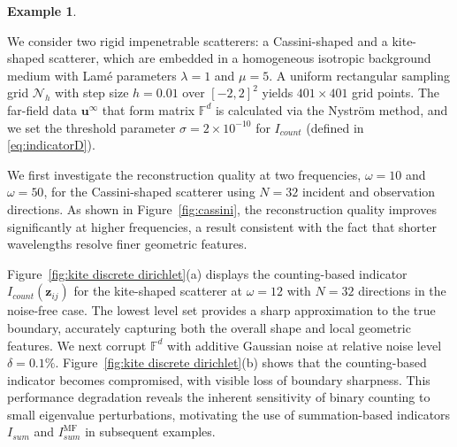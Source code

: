 \documentclass[11pt,reqno,twoside]{amsart}
\theoremstyle{definition}
\newtheorem{example}{Example}[section]
\theoremstyle{remark}
\numberwithin{equation}{section}
\begin{document}
\begin{example}\label{ex:Dirichlet discrete}

We consider two rigid impenetrable scatterers: a Cassini-shaped and a kite-shaped scatterer, which are embedded in a homogeneous isotropic background medium with Lam\'{e} parameters $\lambda = 1$ and $\mu = 5$. A uniform rectangular sampling grid $\mathcal{N}_h$ with step size $h = 0.01$ over $[-2,2]^2$ yields $401 \times 401$ grid points. The far-field data \(\mathbf u^{\infty}\) that form matrix \(\mathbb{F}^d\) is calculated via the Nystr\"{o}m method, and we set the threshold parameter \(\sigma = 2 \times 10^{-10}\) for \(I_{count}\) (defined in \eqref{eq:indicatorD}).

We first investigate the reconstruction quality at two frequencies, $\omega = 10$ and $\omega = 50$, for the Cassini-shaped scatterer using $N = 32$ incident and observation directions. As shown in Figure~\ref{fig:cassini}, the reconstruction quality improves significantly at higher frequencies, a result consistent with the fact that shorter wavelengths resolve finer geometric features.

Figure~\ref{fig:kite discrete dirichlet}(a) displays the counting-based indicator $I_{count}(\mathbf{z}_{ij})$ for the kite-shaped scatterer at $\omega = 12$ with $N = 32$ directions in the noise-free case. The lowest level set provides a sharp approximation to the true boundary, accurately capturing both the overall shape and local geometric features. We next corrupt $\mathbb{F}^d$ with additive Gaussian noise at relative noise level $\delta = 0.1\%$. Figure~\ref{fig:kite discrete dirichlet}(b) shows that the counting-based indicator becomes compromised, with visible loss of boundary sharpness. This performance degradation reveals the inherent sensitivity of binary counting to small eigenvalue perturbations, motivating the use of summation-based indicators $I_{sum}$ and $I_{sum}^{\mathrm{MF}}$ in subsequent examples.

\end{example}
\end{document}
